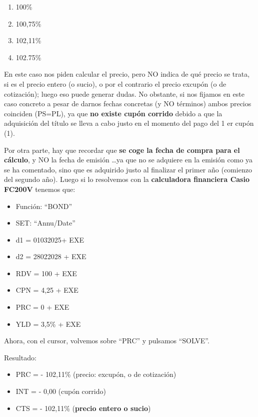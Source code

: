 \documentclass[
  letterpaper,
  DIV=11,
  numbers=noendperiod]{scrartcl}
\begin{document}
\begin{enumerate}
\def\labelenumi{\alph{enumi}.}
\item
  100\%
\item
  100,75\%
\item
  102,11\%
\item
  102.75\%
\end{enumerate}

\begin{tcolorbox}[enhanced jigsaw, colframe=quarto-callout-note-color-frame, opacityback=0, colback=white, leftrule=.75mm, left=2mm, breakable, arc=.35mm, rightrule=.15mm, toprule=.15mm, bottomrule=.15mm]
\begin{minipage}[t]{5.5mm}
\textcolor{quarto-callout-note-color}{\faInfo}
\end{minipage}%
\begin{minipage}[t]{\textwidth - 5.5mm}

En este caso nos piden calcular el precio, pero NO indica de qué precio
se trata, si es el precio entero (o sucio), o por el contrario el precio
excupón (o de cotización); luego eso puede generar dudas. No obstante,
si nos fijamos en este caso concreto a pesar de darnos fechas concretas
(y NO términos) ambos precios coinciden (PS=PL), ya que \textbf{no
existe cupón corrido} debido a que la adquisición del título se lleva a
cabo justo en el momento del pago del 1 er cupón (1).

Por otra parte, hay que recordar que \textbf{se coge la fecha de compra
para el cálculo}, y NO la fecha de emisión \ldots ya que no se adquiere
en la emisión como ya se ha comentado, sino que es adquirido justo al
finalizar el primer año (comienzo del segundo año). Luego si lo
resolvemos con la \textbf{calculadora financiera Casio FC200V} tenemos
que:

\begin{itemize}
\item
  Función: ``BOND''
\item
  SET: ``Annu/Date''
\item
  d1 = 01032025+ EXE
\item
  d2 = 28022028 + EXE
\item
  RDV = 100 + EXE
\item
  CPN = 4,25 + EXE
\item
  PRC = 0 + EXE
\item
  YLD = 3,5\% + EXE
\end{itemize}

Ahora, con el cursor, volvemos sobre ``PRC'' y pulsamos ``SOLVE''.

Resultado:

\begin{itemize}
\item
  PRC = - 102,11\% (precio: excupón, o de cotización)
\item
  INT = - 0,00 (cupón corrido)
\item
  CTS = - 102,11\% (\textbf{precio entero o sucio})
\end{itemize}

\end{minipage}%
\end{tcolorbox}
\end{document}
